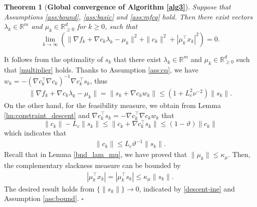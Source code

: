 \documentclass[11pt]{article}
\newtheorem{theorem}{Theorem}
\newenvironment{proof}{{\noindent\it Proof.}\quad}{\hfill $\square$\par}
\def\red#1{\textcolor{red}{#1}}
\newcommand{\R}{\mathbb{R}}
\newcommand{\be}{\begin{equation}}
\newcommand{\ee}{\end{equation}}
\begin{document}
\begin{theorem}[{\bf Global convergence of Algorithm \ref{alg3}}]\label{cor:det-convergence-2}
     Suppose that Assumptions \ref{ass:bound}, \ref{ass:basic} and \ref{ass:mfcq} hold. Then  there exist vectors \(\lambda_k \in \R^m\) and \(\mu_k \in \R^d_{\ge 0}\) for  \(k \ge 0\), such that
    \[
    \lim_{k \to \infty} \left( \|\nabla f_k + \nabla c_k \lambda_k - \mu_k\|^2 + \|c_k\|^2 + |\mu_k^\top x_k|^2 \right) = 0.
    \]
\end{theorem}
\begin{proof}
    It follows from the optimality of $s_k$ that  %
    there exist  \(\lambda_k \in \R^m\) and  \(\mu_k \in \R^d_{\ge 0}\) such that \eqref{multiplier} holds. 
    Thanks to Assumption \ref{ass:cq}, we have \(w_k = -(\nabla c_k^\top \nabla c_k)^{-1} \nabla c_k^\top s_k\), thus 
    \begin{align}\label{kkt-sta}
        \|\nabla f_k + \nabla c_k \lambda_k - \mu_k\| = \|s_k + \nabla c_k w_k\| \leq \left(1+L_c^2\nu^{-2}\right)\|s_k\|.
    \end{align}
    On the other hand, for the feasibility measure, we obtain from Lemma \ref{lm:constraint_descent} and \(\nabla c_k^\top s_k = - \nabla c_k^\top \nabla c_k w_k\) that 
    \[
    \|c_k\|-L_c\|s_k\| \leq \|c_k + \nabla c_k^\top s_k\| \leq (1-\vartheta)\|c_k\|
    \]
    which indicates that 
    \begin{align*}%
        \|c_k\| \leq L_c\vartheta^{-1}\|s_k\|.
    \end{align*} 
    Recall that in Lemma \ref{bnd_lam_mu}, we have proved that $\|\mu_k\|\le \kappa_\mu$. 
    Then, the complementary slackness measure can be bounded by
    \begin{align}\label{kkt-com}
    |\mu_k^\top x_k| = |\mu_k^\top s_k| \leq \kappa_\mu \|s_k\|.
    \end{align}
    The desired result holds from \(\{\|s_k\|\}\to 0\), indicated by \eqref{descent-ine} and Assumption \ref{ass:bound}. 
\end{proof}
\end{document}
